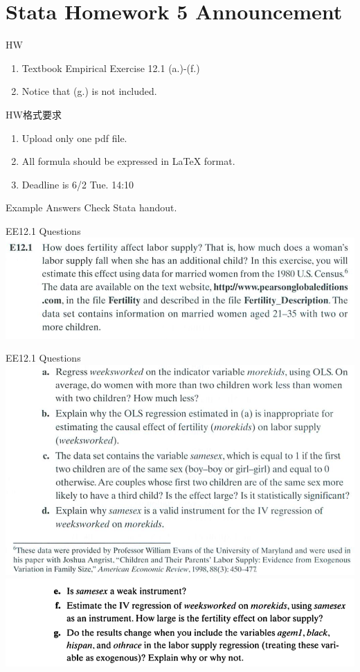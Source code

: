 

\section{Stata Homework 5 Announcement}


%
\begin{frame}[fragile]{HW}
    \begin{enumerate}
        \item Textbook Empirical Exercise 12.1 (a.)-(f.)
        \item Notice that (g.) is not included.
    \end{enumerate}

\end{frame}

%
\begin{frame}[fragile]{HW格式要求}
    \begin{enumerate}
        \item Upload only one pdf file.
        \item All formula should be expressed in LaTeX format.
        \item Deadline is 6/2 Tue. 14:10
    \end{enumerate}


\end{frame}

%
\begin{frame}[fragile]{Example Answers}
    Check Stata handout.
\end{frame}



%
\begin{frame}[fragile]{EE12.1 Questions}
    \includegraphics[width=1\textwidth]{Images/EE12-1_1.png}
\end{frame}

%
\begin{frame}[fragile]{EE12.1 Questions}
    \includegraphics[width=1\textwidth]{Images/EE12-1_2.png}
    \includegraphics[width=1\textwidth]{Images/EE12-1_3.png}
\end{frame}